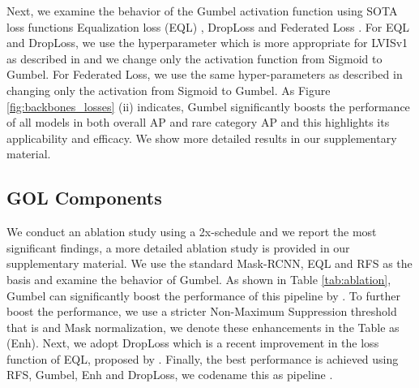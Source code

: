 \documentclass[runningheads]{llncs}
\begin{document}
Next, we examine the behavior of the Gumbel activation function using SOTA loss functions Equalization loss (EQL) \cite{tan2020equalization}, DropLoss \cite{hsieh2021droploss} and Federated Loss \cite{zhou2021probablistic}. For EQL and DropLoss, we use the hyperparameter  which is more appropriate for LVISv1 as described in \cite{tan2021equalization} and we change only the activation function from Sigmoid to Gumbel. For Federated Loss, we use the same hyper-parameters as described in \cite{zhou2021probablistic} changing only the activation from Sigmoid to Gumbel. As Figure  \ref{fig:backbones_losses} (ii) indicates, Gumbel significantly boosts the performance of all models in both overall AP and rare category AP and this highlights its applicability and efficacy. 
We show more detailed results in our supplementary material.
















\subsection{GOL Components}
We conduct an ablation study using a 2x-schedule and we report the most significant findings, a more detailed ablation study is provided in our supplementary material.
We use the standard Mask-RCNN, EQL \cite{tan2020equalization} and RFS \cite{gupta2019lvis} as the basis and examine the behavior of Gumbel.
As shown in Table \ref{tab:ablation}, Gumbel can significantly boost the performance of this pipeline by . To further boost the performance, we use a stricter Non-Maximum Suppression threshold that is  and Mask normalization, we denote these enhancements in the Table as (Enh). Next, we adopt DropLoss which is a recent improvement in the loss function of EQL, proposed by \cite{hsieh2021droploss}.
Finally, the best performance is achieved using RFS, Gumbel, Enh and DropLoss, we codename this as pipeline . 
\end{document}
